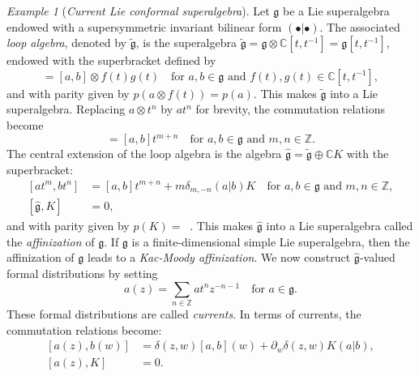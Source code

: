 \documentclass[a4paper, 12pt, reqno]{amsart}
\theoremstyle{remark}
\newtheorem{example}[theorem]{Example}
\numberwithin{equation}{subsection}
\DeclareMathOperator{\zero}{\overline{0}}
\begin{document}
\begin{example}[\emph{Current Lie conformal superalgebra}]
  Let $\mathfrak{g}$ be a Lie superalgebra endowed with a supersymmetric invariant bilinear form $(\bullet| \bullet)$.
  The associated \emph{loop algebra}, denoted by $\tilde{\mathfrak{g}}$, is the superalgebra $\tilde{\mathfrak{g}} = \mathfrak{g} \otimes \mathbb{C}[t, t^{-1}] = \mathfrak{g}[t, t^{-1}]$, endowed with the superbracket defined by
  \begin{equation*}
    [a\otimes f(t), b\otimes g(t)] = [a, b]\otimes f(t)g(t) \quad \text{for }a, b \in \mathfrak{g}\text{ and }f(t), g(t) \in \mathbb{C}[t, t^{-1}],
  \end{equation*}
  and with parity given by $p(a\otimes f(t)) = p(a)$.
  This makes $\tilde{\mathfrak{g}}$ into a Lie superalgebra.
  Replacing $a\otimes t^n$ by $at^n$ for brevity, the commutation relations become
  \begin{equation*}
    [at^m, bt^n] = [a, b]t^{m + n} \quad \text{for }a, b \in \mathfrak{g}\text{ and }m, n \in \mathbb{Z}.
  \end{equation*}
  The central extension of the loop algebra is the algebra $\hat{\mathfrak{g}} = \tilde{\mathfrak{g}} \oplus \mathbb{C}K$ with the superbracket:
  \begin{equation*}
    \begin{split}
      [at^m, bt^n] &= [a, b]t^{m + n} + m\delta_{m, -n}(a| b)K \quad \text{for }a, b \in \mathfrak{g}\text{ and }m, n \in \mathbb{Z}, \\
      [\hat{\mathfrak{g}}, K] &= 0,
    \end{split}
  \end{equation*}
  and with parity given by $p(K) = \zero$.
  This makes $\hat{\mathfrak{g}}$ into a Lie superalgebra called the \emph{affinization} of $\mathfrak{g}$.
  If $\mathfrak{g}$ is a finite-dimensional simple Lie superalgebra, then the affinization of $\mathfrak{g}$ leads to a \emph{Kac-Moody affinization}.
  We now construct $\hat{\mathfrak{g}}$-valued formal distributions by setting
  \begin{equation*}
    a(z) = \sum_{n \in \mathbb{Z}}at^nz^{-n - 1} \quad \text{for }a \in \mathfrak{g}.
  \end{equation*}
  These formal distributions are called \emph{currents}.
  In terms of currents, the commutation relations become:
  \begin{equation*}
    \begin{split}
      [a(z), b(w)] &= \delta(z, w)[a, b](w) + \partial_w\delta(z, w)K(a| b), \\
      [a(z), K] &= 0.
    \end{split}

\end{equation*}
\end{example}
\end{document}
